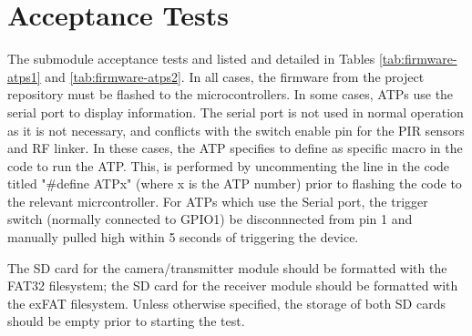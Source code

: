 \documentclass[class=report,11pt,crop=false]{standalone}
\begin{document}



\section{Acceptance Tests \label{s:firmware-atps}}

The submodule acceptance tests and listed and detailed in Tables \ref{tab:firmware-atps1} and \ref{tab:firmware-atps2}. In all cases, the firmware from the project repository must be flashed to the microcontrollers. In some cases, ATPs use the serial port to display information. The serial port is not used in normal operation as it is not necessary, and conflicts with the switch enable pin for the PIR sensors and RF linker.  In these cases, the ATP specifies to define as specific macro in the code to run the ATP. This, is performed by uncommenting the line in the code titled "\#define ATPx" (where x is the ATP number) prior to flashing the code to the relevant micrcontroller. For ATPs which use the Serial port, the trigger switch (normally connected to GPIO1) be disconnnected from pin 1 and manually pulled high within 5 seconds of triggering the device.

The SD card for the camera/transmitter module should be formatted with the FAT32 filesystem; the SD card for the receiver module should be formatted with the exFAT filesystem. Unless otherwise specified, the storage of both SD cards should be empty prior to starting the test.
\end{document}
